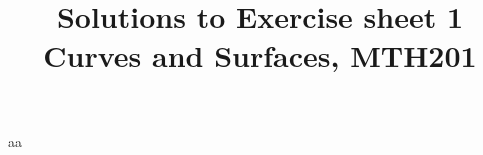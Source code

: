 \documentclass[a4paper]{article}
\title{Solutions to Exercise sheet 1\\ {\small Curves and Surfaces, MTH201} }
\date{}
\begin{document}
\maketitle
aa
\end{document}

